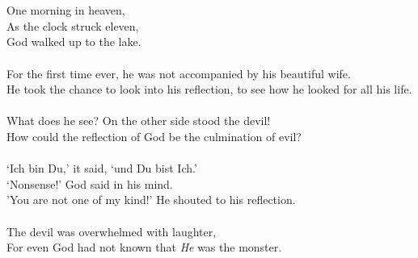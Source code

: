 \documentclass{article}
\begin{document}
\section*{ }
One morning in heaven,
\\As the clock struck eleven,
\\God walked up to the lake.
\\
\\For the first time ever, he was not accompanied by his beautiful wife.
\\He took the chance to look into his reflection, to see how he looked for all his life.
\\
\\What does he see? On the other side stood the devil!
\\How could the reflection of God be the culmination of evil?
\\
\\`Ich bin Du,' it said, `und Du bist Ich.'
\\`Nonsense!' God said in his mind.
\\'You are not one of my kind!' He shouted to his reflection.
\\
\\The devil was overwhelmed with laughter,
\\For even God had not known that \textit{He} was the monster.
\end{document}
